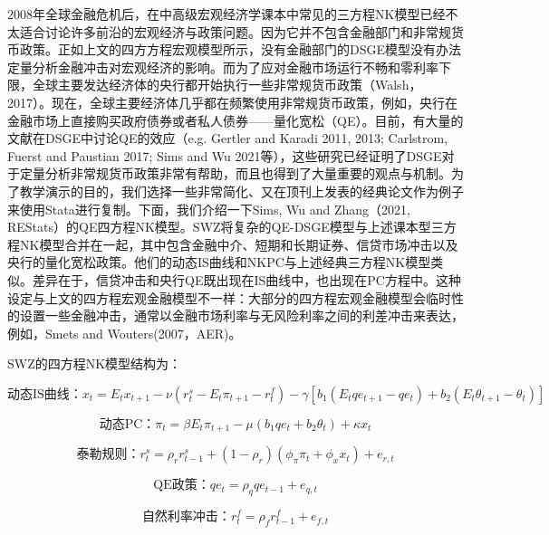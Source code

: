 \documentclass[cn,12pt,math=newtx,citestyle=gb7714-2015,bibstyle=gb7714-2015]{elegantbook}
\begin{document}
	2008年全球金融危机后，在中高级宏观经济学课本中常见的三方程NK模型已经不太适合讨论许多前沿的宏观经济与政策问题。因为它并不包含金融部门和非常规货币政策。正如上文的四方方程宏观模型所示，没有金融部门的DSGE模型没有办法定量分析金融冲击对宏观经济的影响。而为了应对金融市场运行不畅和零利率下限，全球主要发达经济体的央行都开始执行一些非常规货币政策（Walsh，2017）。现在，全球主要经济体几乎都在频繁使用非常规货币政策，例如，央行在金融市场上直接购买政府债券或者私人债券——量化宽松（QE）。目前，有大量的文献在DSGE中讨论QE的效应（e.g. Gertler and Karadi 2011, 2013; Carlstrom, Fuerst and Paustian 2017; Sims and Wu 2021等），这些研究已经证明了DSGE对于定量分析非常规货币政策非常有帮助，而且也得到了大量重要的观点与机制。为了教学演示的目的，我们选择一些非常简化、又在顶刊上发表的经典论文作为例子来使用Stata进行复制。下面，我们介绍一下Sims, Wu and Zhang（2021, REStats）的QE四方程NK模型。SWZ将复杂的QE-DSGE模型与上述课本型三方程NK模型合并在一起，其中包含金融中介、短期和长期证券、信贷市场冲击以及央行的量化宽松政策。他们的动态IS曲线和NKPC与上述经典三方程NK模型类似。差异在于，信贷冲击和央行QE既出现在IS曲线中，也出现在PC方程中。这种设定与上文的四方程宏观金融模型不一样：大部分的四方程宏观金融模型会临时性的设置一些金融冲击，通常以金融市场利率与无风险利率之间的利差冲击来表达，例如，Smets and Wouters(2007，AER)。
	
	SWZ的四方程NK模型结构为：
	
		\begin{equation}
		\text{动态IS曲线：}x_t = E_t x_{t+1} - \nu(r_t^s - E_t\pi_{t+1} - r_t^f) - \gamma[b_1(E_t qe_{t+1} - qe_t)+b_2(E_t \theta_{t+1}-\theta_t)]
	\end{equation}
	
	
	\begin{equation}
		\text{动态PC：}\pi_t =\beta E_t \pi_{t+1}  - \mu (b_1 qe_t + b_2 \theta_t) + \kappa x_t
	\end{equation}
	
	\begin{equation}
		\text{泰勒规则：} r_t^s =\rho_r r_{t-1}^s + (1-\rho_r)(\phi_\pi \pi_{t} + \phi_x x_t) + e_{r,t}
	\end{equation}
	
	\begin{equation}
		\text{QE政策：} qe_t =\rho_q qe_{t-1}  + e_{q,t}
	\end{equation}
	
	\begin{equation}
		\text{自然利率冲击：}r_t^f =\rho_f r_{t-1}^f + e_{f,t}
	\end{equation}
	
\end{document}
